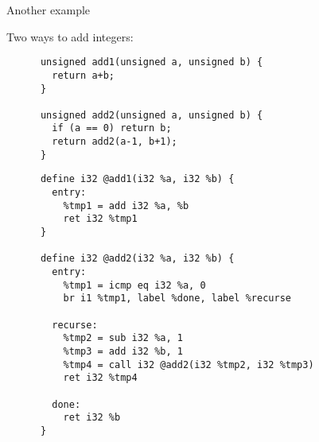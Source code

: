 \documentclass[8pt]{beamer}
\begin{document}
\begin{frame}[fragile]{Another example}
  \begin{exampleblock}{Two ways to add integers:}
    \begin{verbatim}
      unsigned add1(unsigned a, unsigned b) {
        return a+b;
      }

      unsigned add2(unsigned a, unsigned b) {
        if (a == 0) return b;
        return add2(a-1, b+1);
      }
    \end{verbatim}

    \begin{verbatim}
      define i32 @add1(i32 %a, i32 %b) {
        entry:
          %tmp1 = add i32 %a, %b
          ret i32 %tmp1
      }

      define i32 @add2(i32 %a, i32 %b) {
        entry:
          %tmp1 = icmp eq i32 %a, 0
          br i1 %tmp1, label %done, label %recurse

        recurse:
          %tmp2 = sub i32 %a, 1
          %tmp3 = add i32 %b, 1
          %tmp4 = call i32 @add2(i32 %tmp2, i32 %tmp3)
          ret i32 %tmp4

        done:
          ret i32 %b
      }
    \end{verbatim}
  \end{exampleblock}
\end{frame}
\end{document}
